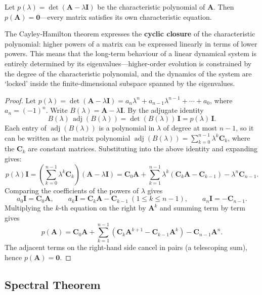 \begin{theorem}\label{thm:cayley_hamilton}
Let $p(\lambda) = \det(\mathbf{A} - \lambda \mathbf{I})$ be the characteristic polynomial of $\mathbf{A}$. Then $p(\mathbf{A}) = \mathbf{0}$---every matrix satisfies its own characteristic equation.

The Cayley-Hamilton theorem expresses the \textbf{cyclic closure} of the characteristic polynomial: higher powers of a matrix can be expressed linearly in terms of lower powers. This means that the long-term behaviour of a linear dynamical system is entirely determined by its eigenvalues---higher-order evolution is constrained by the degree of the characteristic polynomial, and the dynamics of the system are `locked' inside the finite-dimensional subspace spanned by the eigenvalues.
\end{theorem}

\begin{proof}
Let $p(\lambda) = \det(\mathbf{A}-\lambda\mathbf{I}) = a_n\lambda^n + a_{n-1}\lambda^{n-1} + \cdots + a_0$, where $a_n = (-1)^n$. Write $B(\lambda) = \mathbf{A}-\lambda\mathbf{I}$. By the adjugate identity
\[
B(\lambda)\,\operatorname{adj}(B(\lambda)) = \det(B(\lambda))\,\mathbf{I} = p(\lambda)\,\mathbf{I}.
\]
Each entry of $\operatorname{adj}(B(\lambda))$ is a polynomial in $\lambda$ of degree at most $n-1$, so it can be written as the matrix polynomial $\operatorname{adj}(B(\lambda)) = \sum_{k=0}^{n-1}\lambda^k\mathbf{C}_k$, where the $\mathbf{C}_k$ are constant matrices. Substituting into the above identity and expanding gives:
\[
p(\lambda)\mathbf{I} = \left(\sum_{k=0}^{n-1}\lambda^k\mathbf{C}_k\right)(\mathbf{A}-\lambda\mathbf{I})
= \mathbf{C}_0\mathbf{A} + \sum_{k=1}^{n-1}\lambda^k(\mathbf{C}_k\mathbf{A}-\mathbf{C}_{k-1}) - \lambda^n\mathbf{C}_{n-1}.
\]
Comparing the coefficients of the powers of $\lambda$ gives
\[
a_0\mathbf{I} = \mathbf{C}_0\mathbf{A},\qquad a_k\mathbf{I} = \mathbf{C}_k\mathbf{A}-\mathbf{C}_{k-1}\ (1\le k\le n-1),\qquad a_n\mathbf{I} = -\mathbf{C}_{n-1}.
\]
Multiplying the $k$-th equation on the right by $\mathbf{A}^k$ and summing term by term gives
\[
p(\mathbf{A}) = \mathbf{C}_0\mathbf{A} + \sum_{k=1}^{n-1}(\mathbf{C}_k\mathbf{A}^{k+1}-\mathbf{C}_{k-1}\mathbf{A}^k) - \mathbf{C}_{n-1}\mathbf{A}^n.
\]
The adjacent terms on the right-hand side cancel in pairs (a telescoping sum), hence $p(\mathbf{A}) = \mathbf{0}$.
\end{proof}

\subsection{\texorpdfstring{Spectral Theorem}{Spectral Theorem}}

